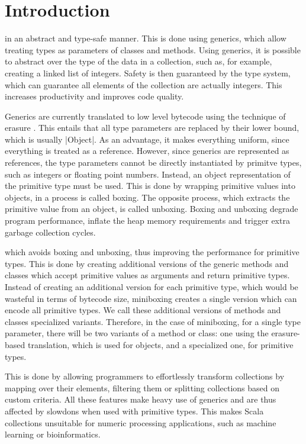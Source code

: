 \section{Introduction}

 in an abstract and type-safe manner. This is done using generics, which allow treating types as parameters of classes and methods. Using generics, it is possible to abstract over the type of the data in a collection, such as, for example, creating a linked list of integers. Safety is then guaranteed by the type system, which can guarantee all elements of the collection are actually integers. This increases productivity and improves code quality.

Generics are currently translated to low level bytecode using the technique of erasure \cite{java-erasure}. This entails that all type parameters are replaced by their lower bound, which is usually |Object|. As an advantage, it makes everything uniform, since everything is treated as a reference. However, since generics are represented as references, the type parameters cannot be directly instantiated by primitve types, such as integers or floating point numbers. Instead, an object representation of the primitive type must be used. This is done by wrapping primitive values into objects, in a process is called boxing. The opposite process, which extracts the primitive value from an object, is called unboxing. Boxing and unboxing degrade program performance, inflate the heap memory requirements and trigger extra garbage collection cycles.

 which avoids boxing and unboxing, thus improving the performance for primitive types. This is done by creating additional versions of the generic methods and classes which accept primitive values as arguments and return primitive types. Instead of creating an additional version for each primitive type, which would be wasteful in terms of bytecode size, miniboxing creates a single version which can encode all primitive types. We call these additional versions of methods and classes specialized variants. Therefore, in the case of miniboxing, for a single type parameter, there will be two variants of a method or class: one using the erasure-based translation, which is used for objects, and a specialized one, for primitive types.

 This is done by allowing programmers to effortlessly transform collections by mapping over their elements, filtering them or splitting collections based on custom criteria. All these features make heavy use of generics and are thus affected by slowdons when used with primitive types. This makes Scala collections unsuitable for numeric processing applications, such as machine learning or bioinformatics.

